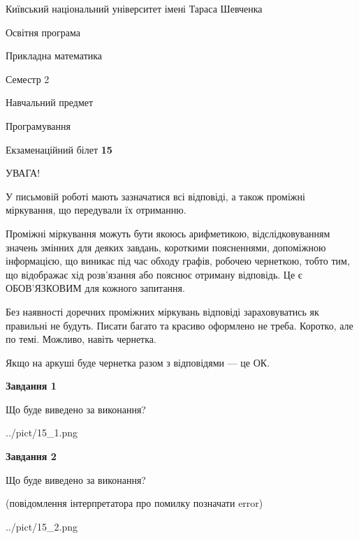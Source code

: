\documentclass[12pt, ukrainian]{article}
\begin{document}
{{\begin {small}\par
{ \center  Київський національний університет імені Тараса Шевченка \par}
{\parbox {5 cm}{Освітня програма \hfill}{\parbox {7 cm}{Прикладна математика\hfill}}\parbox {6 cm}{\hfill Семестр 2}}\par
{\parbox {5 cm} {Навчальний предмет \hfill}\parbox {7 cm}{Програмування \hfill}\parbox {6cm}{\hfill}\par}\vspace{-7pt} \end{small}}{\center Екзаменаційний білет \No \textbf
{ 15 }\par}}
{
\begin {large}
УВАГА!

У письмовій роботі мають зазначатися всі відповіді, а також проміжні міркування, що передували їх отриманню.

Проміжні міркування можуть бути якоюсь арифметикою, відслідковуванням зна\-чень змінних для деяких завдань,
короткими поясненнями, допоміжною інформацією, що виникає під час обходу графів, робочею чернеткою,
тобто тим, що відображає хід розв’язання або пояснює отриману відповідь.
Це є ОБОВ’ЯЗКОВИМ для кожного запитання.

Без наявності доречних проміжних міркувань відповіді зараховуватись як правиль\-ні не будуть.
Писати багато та красиво оформлено не треба. Коротко, але по темі. Можли\-во, навіть чернетка.

Якщо на аркуші буде чернетка разом з відповідями --- це ОК.

\newpage

{\begin {center}\textbf{Завдання 1}\end {center}}\par
Що буде виведено за виконання?\par
\begin{center}
	{../pict/15_1.png}
\end{center}
\newpage

{\begin {center}\textbf{Завдання 2}\end {center}}\par
Що буде виведено за виконання?\par
 (повідомлення інтерпретатора про помилку позначати error)\par
\begin{center}
	{../pict/15_2.png}
\end{center}
\newpage


\end{large}}
\end{document}

